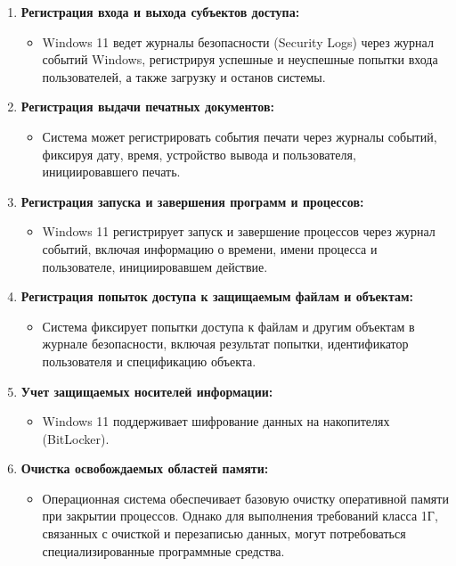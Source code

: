 \documentclass[a4paper, 14pt]{report}
\begin{document}
\begin{enumerate}
    \item \textbf{Регистрация входа и выхода субъектов доступа:}
          \begin{itemize}
              \item Windows 11 ведет журналы безопасности (Security Logs) через журнал событий Windows, регистрируя успешные и неуспешные попытки входа пользователей, а также загрузку и останов системы.
          \end{itemize}
    \item \textbf{Регистрация выдачи печатных документов:}
          \begin{itemize}
              \item Система может регистрировать события печати через журналы событий, фиксируя дату, время, устройство вывода и пользователя, инициировавшего печать.
          \end{itemize}
    \item \textbf{Регистрация запуска и завершения программ и процессов:}
          \begin{itemize}
              \item Windows 11 регистрирует запуск и завершение процессов через журнал событий, включая информацию о времени, имени процесса и пользователе, инициировавшем действие.
          \end{itemize}
    \item \textbf{Регистрация попыток доступа к защищаемым файлам и объектам:}
          \begin{itemize}
              \item Система фиксирует попытки доступа к файлам и другим объектам в журнале безопасности, включая результат попытки, идентификатор пользователя и спецификацию объекта.
          \end{itemize}
    \item \textbf{Учет защищаемых носителей информации:}
          \begin{itemize}
              \item Windows 11 поддерживает шифрование данных на накопителях (BitLocker).
          \end{itemize}
    \item \textbf{Очистка освобождаемых областей памяти:}
          \begin{itemize}
              \item Операционная система обеспечивает базовую очистку оперативной памяти при закрытии процессов. Однако для выполнения требований класса 1Г, связанных с очисткой и перезаписью данных, могут потребоваться специализированные программные средства.
          \end{itemize}
\end{enumerate}
\end{document}
